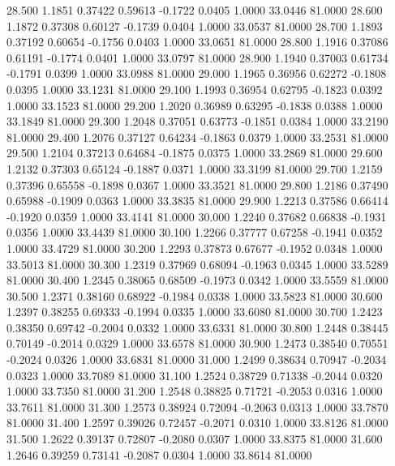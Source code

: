   28.500   1.1851   0.37422   0.59613  -0.1722   0.0405   1.0000  33.0446  81.0000
  28.600   1.1872   0.37308   0.60127  -0.1739   0.0404   1.0000  33.0537  81.0000
  28.700   1.1893   0.37192   0.60654  -0.1756   0.0403   1.0000  33.0651  81.0000
  28.800   1.1916   0.37086   0.61191  -0.1774   0.0401   1.0000  33.0797  81.0000
  28.900   1.1940   0.37003   0.61734  -0.1791   0.0399   1.0000  33.0988  81.0000
  29.000   1.1965   0.36956   0.62272  -0.1808   0.0395   1.0000  33.1231  81.0000
  29.100   1.1993   0.36954   0.62795  -0.1823   0.0392   1.0000  33.1523  81.0000
  29.200   1.2020   0.36989   0.63295  -0.1838   0.0388   1.0000  33.1849  81.0000
  29.300   1.2048   0.37051   0.63773  -0.1851   0.0384   1.0000  33.2190  81.0000
  29.400   1.2076   0.37127   0.64234  -0.1863   0.0379   1.0000  33.2531  81.0000
  29.500   1.2104   0.37213   0.64684  -0.1875   0.0375   1.0000  33.2869  81.0000
  29.600   1.2132   0.37303   0.65124  -0.1887   0.0371   1.0000  33.3199  81.0000
  29.700   1.2159   0.37396   0.65558  -0.1898   0.0367   1.0000  33.3521  81.0000
  29.800   1.2186   0.37490   0.65988  -0.1909   0.0363   1.0000  33.3835  81.0000
  29.900   1.2213   0.37586   0.66414  -0.1920   0.0359   1.0000  33.4141  81.0000
  30.000   1.2240   0.37682   0.66838  -0.1931   0.0356   1.0000  33.4439  81.0000
  30.100   1.2266   0.37777   0.67258  -0.1941   0.0352   1.0000  33.4729  81.0000
  30.200   1.2293   0.37873   0.67677  -0.1952   0.0348   1.0000  33.5013  81.0000
  30.300   1.2319   0.37969   0.68094  -0.1963   0.0345   1.0000  33.5289  81.0000
  30.400   1.2345   0.38065   0.68509  -0.1973   0.0342   1.0000  33.5559  81.0000
  30.500   1.2371   0.38160   0.68922  -0.1984   0.0338   1.0000  33.5823  81.0000
  30.600   1.2397   0.38255   0.69333  -0.1994   0.0335   1.0000  33.6080  81.0000
  30.700   1.2423   0.38350   0.69742  -0.2004   0.0332   1.0000  33.6331  81.0000
  30.800   1.2448   0.38445   0.70149  -0.2014   0.0329   1.0000  33.6578  81.0000
  30.900   1.2473   0.38540   0.70551  -0.2024   0.0326   1.0000  33.6831  81.0000
  31.000   1.2499   0.38634   0.70947  -0.2034   0.0323   1.0000  33.7089  81.0000
  31.100   1.2524   0.38729   0.71338  -0.2044   0.0320   1.0000  33.7350  81.0000
  31.200   1.2548   0.38825   0.71721  -0.2053   0.0316   1.0000  33.7611  81.0000
  31.300   1.2573   0.38924   0.72094  -0.2063   0.0313   1.0000  33.7870  81.0000
  31.400   1.2597   0.39026   0.72457  -0.2071   0.0310   1.0000  33.8126  81.0000
  31.500   1.2622   0.39137   0.72807  -0.2080   0.0307   1.0000  33.8375  81.0000
  31.600   1.2646   0.39259   0.73141  -0.2087   0.0304   1.0000  33.8614  81.0000
